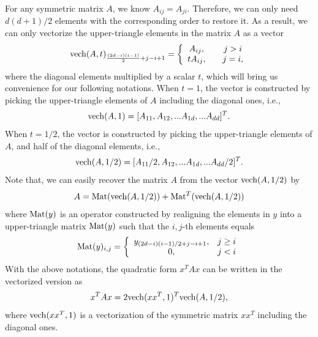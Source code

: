 \documentclass{article}
\theoremstyle{remark}
\begin{document}
For any symmetric matrix $A$, we know $A_{ij} = A_{ji}$. Therefore, we can only need ${d(d+1)}/{2}$ elements with the corresponding order to restore it. As a result, we can only vectorize the upper-triangle elements in the matrix $A$ as a vector 
\[
{\rm vech}(A,t)_{\frac{(2d-i)(i-1)}{2}+j-i+1} = \left\{
\begin{array}{cc}
A_{ij},    &\quad j>i\\
tA_{ij},   &\quad j=i,
\end{array}
\right.
\]
where the diagonal elements multiplied by a scalar $t$, which will bring us convenience for our following notations. When $t=1$, the vector is constructed by picking the upper-triangle elements of $A$ including the diagonal ones, i.e., 
\[
{\rm vech}(A,1) = [A_{11},A_{12},...A_{1d},...A_{dd}]^T.
\]
When $t=1/2$, the vector is constructed by picking the upper-triangle elements of $A$, and half of the diagonal elements, i.e.,
\[
{\rm vech}(A,{1}/{2}) = [A_{11}/2,A_{12},...A_{1d},...A_{dd}/2]^T.
\]
Note that, we can easily recover the matrix $A$ from the vector ${\rm vech}(A,1/2)$ by
\[
A = {\rm Mat} ({\rm vech}(A,1/2)) + {\rm Mat}^T ({\rm vech}(A,1/2)) 
\]
where ${\rm Mat}(y)$ is an operator constructed by realigning the elements in $y$ into a upper-triangle matrix ${\rm Mat} (y)$ such that the $i,j$-th elements equals
\[
{\rm Mat} (y) _{i,j} =\left\{
\begin{array}{cc}
 y_{{(2d-i)(i-1)}/{2}+j-i+1},& j\geq i\\
 0,& j<i
\end{array}
 \right.
\]
With the above notations, the quadratic form $x^T A x$ can be written in the vectorized version as
\[
x^T A x = 2{\rm vech}(xx^T,1)^T {\rm vech}(A,1/2),
\]
where ${\rm vech}(xx^T,1)$ is a vectorization of the symmetric matrix $xx^T$ including the diagonal ones.
\end{document}
